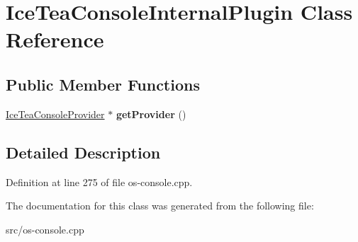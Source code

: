 \hypertarget{class_ice_tea_console_internal_plugin}{}\section{Ice\+Tea\+Console\+Internal\+Plugin Class Reference}
\label{class_ice_tea_console_internal_plugin}
\subsection*{Public Member Functions}
\begin{DoxyCompactItemize}
\item 
\hyperlink{class_ice_tea_console_provider}{Ice\+Tea\+Console\+Provider} $\ast$ {\bfseries get\+Provider} ()\hypertarget{class_ice_tea_console_internal_plugin_a1eedaab701ff270c374b44bb528b7f64}{}\label{class_ice_tea_console_internal_plugin_a1eedaab701ff270c374b44bb528b7f64}

\end{DoxyCompactItemize}


\subsection{Detailed Description}


Definition at line 275 of file os-\/console.\+cpp.



The documentation for this class was generated from the following file\+:\begin{DoxyCompactItemize}
\item 
src/os-\/console.\+cpp\end{DoxyCompactItemize}
